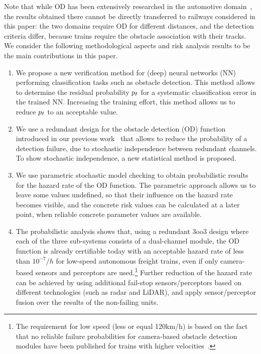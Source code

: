 \documentclass[runningheads,a4paper]{llncs}
\begin{document}
Note that while OD has been extensively   researched in the automotive domain~\cite{CARO2023102872}, the results obtained there cannot be directly transferred to railways considered in this paper: the two domains require OD for different distances, and the detection criteria differ, because trains require the obstacle association with their tracks.
We consider the following methodological aspects and risk analysis results to be the main contributions in this paper.
\begin{enumerate}
\item We propose a new verification method for (deep) neural networks (NN) performing classification tasks such as obstacle detection. This method allows to determine the residual probability ${p_\text{\Lightning}}$
for a systematic classification error in the trained NN. Increasing the training effort, this method allows us to  reduce  ${p_\text{\Lightning}}$ to an acceptable value. 

\item We use a redundant design for the obstacle detection (OD) function introduced in our previous work~\cite{isolapaper2022} that allows to reduce the probability of a detection failure, due to stochastic independence between redundant channels. To show stochastic independence, a new statistical method is proposed.

\item We use parametric 
stochastic  model checking   to obtain probabilistic results for the hazard rate of the OD function.
The parametric approach allows us to leave some     values undefined, so that their influence on the hazard rate becomes visible, and the concrete risk values can be calculated at a later point, when reliable concrete parameter values are available.

\item The probabilistic analysis shows that, using a redundant 3oo3 design where each of the three sub-systems consists of a dual-channel module, the OD function is already certifiable today with an acceptable hazard rate of less than $10^{-7}/h$ for low-speed autonomous freight trains, even if only camera-based sensors and perceptors are used.\footnote{The   requirement for low speed (less or equal 120km/h) is based on the fact that no reliable failure probabilities for camera-based obstacle detection modules have been published for trains with higher velocities~\cite{ristic-durrant_review_2021}.} Further reduction of the hazard rate can be achieved by using additional fail-stop sensors/perceptors based on different technologies (such as radar and LiDAR), and apply sensor/perceptor fusion over the results of the non-failing units.
\end{enumerate}
\end{document}
